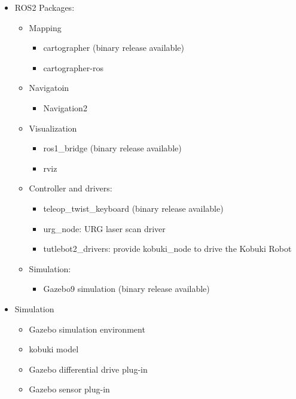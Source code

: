 \documentclass[letterpaper, 10 pt, conference]{ieeeconf}  %
\begin{document}
\begin{itemize}
\item ROS2 Packages:
    \begin{itemize}
        \item Mapping   
            \begin{itemize}
                \item cartographer (binary release available)
                \item cartographer-ros 
            \end{itemize}{}
    \end{itemize}{}
    \begin{itemize}
        \item Navigatoin
            \begin{itemize}
                \item Navigation2 
            \end{itemize}{}
    \end{itemize}{}
    \begin{itemize}
        \item Visualization
            \begin{itemize}
                \item ros1\_bridge (binary release available)
                \item rviz
            \end{itemize}{}
   
        \item Controller and drivers:
            \begin{itemize}
                \item teleop\_twist\_keyboard (binary release available)
                \item urg\_node: URG laser scan driver 
                \item tutlebot2\_drivers: provide kobuki\_node to drive the Kobuki Robot
            \end{itemize}{}
        \item Simulation:
            \begin{itemize}
                \item Gazebo9 simulation (binary release available)
            \end{itemize}{}
    \end{itemize}{} 
\end{itemize}{}

\begin{itemize}
    \item Simulation 
        \begin{itemize}
            \item Gazebo simulation environment 
            \item kobuki model 
            \item Gazebo differential drive plug-in  
            \item Gazebo sensor plug-in 
        \end{itemize}{}
\end{itemize}{}
\end{document}
